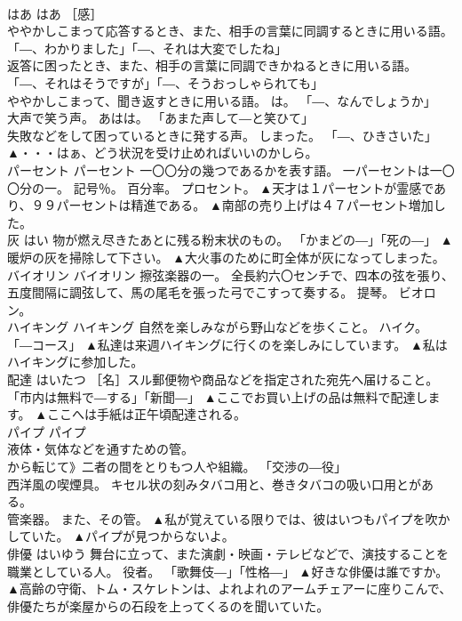 \documentclass[8pt]{extreport}
\begin{document}
\begin{CJK}{UTF8}{min}
\\	はあ	はあ	［感］ 
\\	ややかしこまって応答するとき、また、相手の言葉に同調するときに用いる語。 「―、わかりました」「―、それは大変でしたね」 
\\	返答に困ったとき、また、相手の言葉に同調できかねるときに用いる語。 「―、それはそうですが」「―、そうおっしゃられても」 
\\	ややかしこまって、聞き返すときに用いる語。 は。 「―、なんでしょうか」 
\\	大声で笑う声。 あはは。 「あまた声して―と笑ひて」 
\\	失敗などをして困っているときに発する声。 しまった。 「―、ひきさいた」	▲・・・はぁ、どう状況を受け止めればいいのかしら。
\\	パーセント	パーセント	一〇〇分の幾つであるかを表す語。 一パーセントは一〇〇分の一。 記号％。 百分率。 プロセント。	▲天才は１パーセントが霊感であり、９９パーセントは精進である。 ▲南部の売り上げは４７パーセント増加した。
\\	灰	はい	物が燃え尽きたあとに残る粉末状のもの。 「かまどの―」「死の―」	▲暖炉の灰を掃除して下さい。 ▲大火事のために町全体が灰になってしまった。
\\	バイオリン	バイオリン	擦弦楽器の一。 全長約六〇センチで、四本の弦を張り、五度間隔に調弦して、馬の尾毛を張った弓でこすって奏する。 提琴。 ビオロン。	
\\	ハイキング	ハイキング	自然を楽しみながら野山などを歩くこと。 ハイク。 「―コース」	▲私達は来週ハイキングに行くのを楽しみにしています。 ▲私はハイキングに参加した。
\\	配達	はいたつ	［名］スル郵便物や商品などを指定された宛先へ届けること。 「市内は無料で―する」「新聞―」	▲ここでお買い上げの品は無料で配達します。 ▲ここへは手紙は正午頃配達される。
\\	パイプ	パイプ	
\\	液体・気体などを通すための管。 
\\	から転じて》二者の間をとりもつ人や組織。 「交渉の―役」 
\\	西洋風の喫煙具。 キセル状の刻みタバコ用と、巻きタバコの吸い口用とがある。 
\\	管楽器。 また、その管。	▲私が覚えている限りでは、彼はいつもパイプを吹かしていた。 ▲パイプが見つからないよ。
\\	俳優	はいゆう	舞台に立って、また演劇・映画・テレビなどで、演技することを職業としている人。 役者。 「歌舞伎―」「性格―」	▲好きな俳優は誰ですか。 ▲高齢の守衛、トム・スケレトンは、よれよれのアームチェアーに座りこんで、俳優たちが楽屋からの石段を上ってくるのを聞いていた。

\end{CJK}
\end{document}
